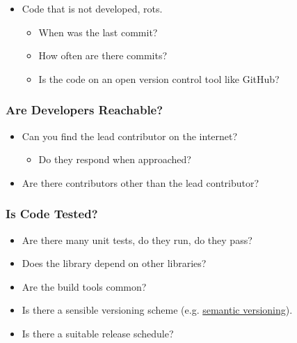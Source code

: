 \begin{itemize}
\itemsep1pt\parskip0pt
\item
  Code that is not developed, rots.

  \begin{itemize}
  \itemsep1pt\parskip0pt
  \item
    When was the last commit?
  \item
    How often are there commits?
  \item
    Is the code on an open version control tool like GitHub?
  \end{itemize}
\end{itemize}

\subsubsection{Are Developers
Reachable?}\label{are-developers-reachable}

\begin{itemize}
\itemsep1pt\parskip0pt
\item
  Can you find the lead contributor on the internet?

  \begin{itemize}
  \itemsep1pt\parskip0pt
  \item
    Do they respond when approached?
  \end{itemize}
\item
  Are there contributors other than the lead contributor?
\end{itemize}

\subsubsection{Is Code Tested?}\label{is-code-tested}

\begin{itemize}
\itemsep1pt\parskip0pt
\item
  Are there many unit tests, do they run, do they pass?
\item
  Does the library depend on other libraries?
\item
  Are the build tools common?
\item
  Is there a sensible versioning scheme (e.g.
  \href{http://www.semver.org/}{semantic versioning}).
\item
  Is there a suitable release schedule?
\end{itemize}

